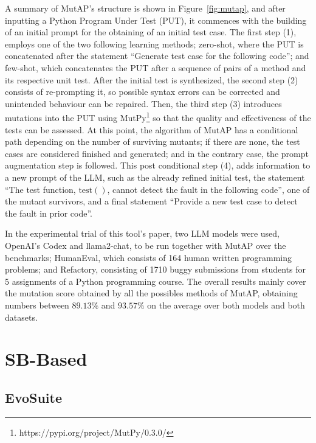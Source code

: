 \documentclass[%
  chapterprefix=false,%
  open=right,%
  twoside=true,%
  paper=a4,%
  logofile={Figures/logo.png},%
  thesistype=master,%
  UKenglish,%
]{se2thesis}
\begin{document}
A summary of MutAP's structure is shown in Figure~\ref{fig:mutap}, and after inputting a Python Program Under Test (PUT), it commences with the building of an initial prompt for the obtaining of an initial test case.
The first step (1), employs one of the two following learning methods; zero-shot, where the PUT is concatenated after the statement  ``Generate test case for the following code''; and few-shot, which concatenates the PUT after a sequence of pairs of a method and its respective unit test.
After the initial test is synthesized, the second step (2) consists of re-prompting it, so possible syntax errors can be corrected and unintended behaviour can be repaired.
Then, the third step (3) introduces mutations into the PUT using MutPy\footnote{https://pypi.org/project/MutPy/0.3.0/} so that the quality and effectiveness of the tests can be assessed.
At this point, the algorithm of MutAP has a conditional path depending on the number of surviving mutants; if there are none, the test cases are considered finished and generated; and in the contrary case, the prompt augmentation step is followed.
This post conditional step (4), adds information to a new prompt of the LLM, such as the already refined initial test, the statement ``The test function, \(\text{test}()\), cannot detect the fault in the
following code'', one of the mutant survivors, and a final statement ``Provide a new test case to detect the fault in prior code''.

In the experimental trial of this tool's paper, two LLM models were used, OpenAI's Codex and llama2-chat, to be run together with MutAP over the benchmarks; HumanEval, which consists of 164 human written programming problems; and Refactory, consisting of 1710 buggy submissions from students for 5 assignments of a Python programming course.
The overall results mainly cover the mutation score obtained by all the possibles methods of MutAP, obtaining numbers between \(89.13\%\) and \(93.57\%\) on the average over both models and both datasets.


\section{SB-Based}

\subsection{EvoSuite}
\end{document}
